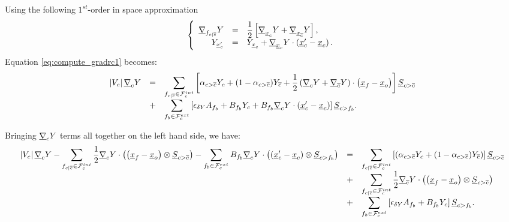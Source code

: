 Using the following $1^{st}$-order in space approximation
\begin{equation}\notag
\left\{\begin{array}{r c l}
\underline{\nabla}_{{{f}_{c|{\overline{c}}}}} Y & = & \displaystyle \dfrac{1}{2}\left[ \underline{\nabla}_{{\underline{x}_{c}}} Y + \underline{\nabla}_{\underline{x}_{{\overline{c}}}} Y \right],\\
Y_{\underline{x}_{c}^\prime} &= & Y_{{\underline{x}_{c}}} + \underline{\nabla}_{{\underline{x}_{c}}} Y \cdot \left(\underline{x}_{c}^\prime - {\underline{x}_{c}}\right) .
\end{array}\right .
\end{equation}
Equation \eqref{eq:compute_gradrc1} becomes:
%
\begin{equation*}
\begin{array}{r c l}
\left| V_{c} \right| \underline{\nabla}_{c} Y &=&
\displaystyle
\sum\limits_{{{f}_{c|{\overline{c}}}} \in \mathcal{F}^{int}_{c}}
\left[\alpha_{{c > {\overline{c}}}} Y_{c}
+ (1 - \alpha_{{c > {\overline{c}}}}) Y_{{\overline{c}}}  + \frac{1}{2}
\left( \underline{\nabla}_{c} Y +\underline{\nabla}_{{\overline{c}}} Y\right) \cdot \left(\underline{x}_{{f}} - \underline{x}_o\right)  \right] {\underline{S}_{{c> {\overline{c}}}}}\\
&+& \displaystyle
\sum\limits_{{{f}_{b}} \in \mathcal{F}^{ext}_{c}}
\left[ \epsilon_{\delta Y}A_{{{f}_{b}}} +
B_{{{f}_{b}}} Y_{c} + B_{{{f}_{b}}} \underline{\nabla}_{c} Y \cdot \left(\underline{x}_{c}^\prime - {\underline{x}_{c}}\right)
\right] \underline{S}_{{c>{{f}_{b}}}}.
\end{array}
\end{equation*}

Bringing $\underline{\nabla}_{c} Y$ terms all together on the left hand side, we have:
%
\begin{equation}\label{eq:gradrc_recontruit}
\begin{array}{r c l}
\displaystyle
\left| V_{c} \right| \underline{\nabla}_{c} Y -
\sum\limits_{ {{f}_{c|{\overline{c}}}} \in \mathcal{F}^{int}_{c}} \frac{1}{2} \underline{\nabla}_c Y \cdot \left( \left(\underline{x}_{{f}} - \underline{x}_o\right) \otimes \underline{S}_{{c > {\overline{c}}}} \right)-
\sum\limits_{ {{f}_{b}} \in \mathcal{F}^{ext}_{c}} B_{{{f}_{b}}} \underline{\nabla}_c Y \cdot \left( \left(\underline{x}_{c}^\prime - {\underline{x}_{c}}\right)  \otimes \underline{S}_{{c>{{f}_{b}}}} \right)
&=&
\displaystyle
\sum\limits_{{{f}_{c|{\overline{c}}}} \in \mathcal{F}^{int}_{c}}\left[
(\alpha_{{c > {\overline{c}}}} Y_{c} + (1 - \alpha_{{c > {\overline{c}}}}) Y_{{\overline{c}}})\right] \underline{S}_{{c > {\overline{c}}}} \\
&+&
\displaystyle
\sum\limits_{{{f}_{c|{\overline{c}}}} \in \mathcal{F}^{int}_{c}} \frac{1}{2} \underline{\nabla}_{{\overline{c}}} Y \cdot \left( \left(\underline{x}_{{f}} - \underline{x}_o\right) \otimes \underline{S}_{{c > {\overline{c}}}} \right) \\
&+&
\displaystyle
\sum\limits_{{{f}_{b}} \in \mathcal{F}^{ext}_{c}}\left[ \epsilon_{\delta Y} A_{{{f}_{b}}} + B_{{{f}_{b}}} Y_{c} \right] \underline{S}_{{c>{{f}_{b}}}}.
\end{array}
\end{equation}

